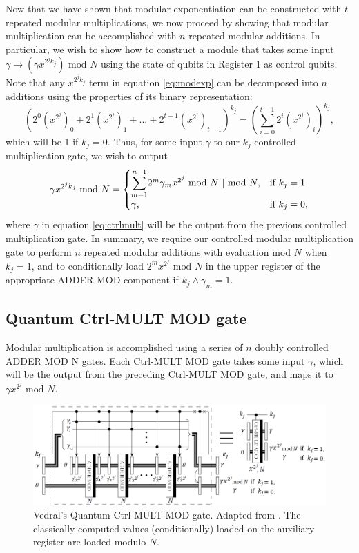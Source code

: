 \documentclass{article}
\begin{document}
Now that we have shown that modular exponentiation can be constructed with $t$ repeated modular multiplications, we now proceed by showing that modular multiplication can be accomplished with $n$ repeated modular additions. In particular, we wish to show how to construct a module that takes some input $\gamma \to (\gamma x^{2^j k_j}) \text{ mod } N$ using the state of qubits in Register 1 as control qubits. Note that any $x^{2^j k_j}$ term in equation \eqref{eq:modexp} can be decomposed into $n$ additions using the properties of its binary representation:
\begin{equation*}
\left(2^0(x^{2^j})_0 + 2^1(x^{2^j})_1 + ... + 2^{t-1}(x^{2^j})_{t-1}\right)^{k_j} = \left(\sum_{i=0}^{t-1}2^i(x^{2^j})_i\right)^{k_j},
\end{equation*}
which will be 1 if $k_j=0$. Thus, for some input $\gamma$ to our $k_j$-controlled multiplication gate, we wish to output
\begin{equation}
\label{eq:ctrlmult}
\gamma x^{2^j k_j} \text{ mod } N = 
\begin{cases}
    \mathlarger\sum_{m=1}^{n-1}2^m\gamma_mx^{2^j} \text{ mod } N \text{  } | \text{  } \text{mod } N, & \text{if } k_j =  1\\
    \gamma ,       & \text{if } k_j = 0,
\end{cases}
\end{equation}
where $\gamma$ in equation \eqref{eq:ctrlmult} will be the output from the previous controlled multiplication gate. In summary, we require our controlled modular multiplication gate to perform $n$ repeated modular additions with evaluation mod $N$ when $k_j = 1$, and to conditionally load $2^m x^{2^j} \text{ mod } N$ in the upper register of the appropriate ADDER MOD component if $k_j \wedge \gamma_m = 1$.

\subsection{Quantum Ctrl-MULT MOD gate}
\label{sec:vedralCTRLMULTMOD}
Modular multiplication is accomplished using a series of $n$ doubly controlled ADDER MOD N gates. Each Ctrl-MULT MOD gate takes some input $\gamma$, which will be the output from the preceding Ctrl-MULT MOD gate, and maps it to $\gamma x^{2^j} \text{ mod }N$.
\pagebreak
\begin{figure}[!htbp]
\centering
\includegraphics[width=1\textwidth]
{vedralcrtlmultmod.png}
\captionsetup{format = hang}
\caption{Vedral's Quantum Ctrl-MULT MOD gate. Adapted from \cite{VBE95}. The classically computed values (conditionally) loaded on the auxiliary register are loaded modulo $N$.}
\label{fig:vedralCTRLMULTMOD}
\end{figure}
\end{document}
